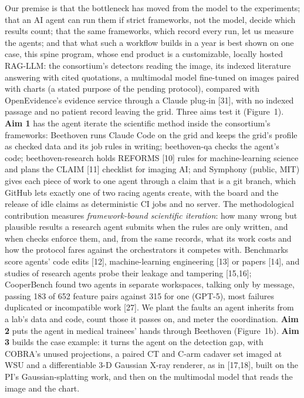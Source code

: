 \documentclass[10pt,letterpaper]{article}
\newcommand{\aim}[1]{{\color{teal}\bfseries #1}}
\begin{document}
Our premise is that the bottleneck has moved from the model to the experiments; that an AI agent can run them if
strict frameworks, not the model, decide which results count; that the same frameworks, which record every run,
let us measure the agents; and that what such a workflow builds in a year is best shown on one case, this spine program,
whose end product is a customizable, locally hosted RAG-LLM: the consortium's detectors reading the image, its indexed
literature answering with cited quotations, a multimodal model fine-tuned on images paired with charts (a stated purpose of the pending protocol), compared with OpenEvidence's evidence service through a Claude plug-in [31], with no
indexed passage and no patient record leaving the grid. Three aims test it (Figure~1). \aim{Aim 1} has the agent iterate the scientific method
inside the consortium's frameworks: Beethoven runs Claude Code on the grid and keeps the grid's profile as checked data
and its job rules in writing; beethoven-qa checks the agent's code; beethoven-research holds REFORMS [10] rules for
machine-learning science and plans the CLAIM [11] checklist for imaging AI; and Symphony (public, MIT) gives each
piece of work to one agent through a claim that is a git branch, which GitHub lets exactly one of two racing agents
create, with the board and the release of idle claims as deterministic CI jobs and no server. The methodological contribution measures \emph{framework-bound scientific iteration}: how many wrong but
plausible results a research agent submits when the rules are only written, and when checks enforce them, and, from
the same records, what its work costs and how the protocol fares against the orchestrators it competes with.
Benchmarks score agents' code edits [12], machine-learning engineering [13] or papers [14], and studies of research
agents probe their leakage and tampering [15,16]; CooperBench found two agents in separate workspaces,
talking only by message, passing 183 of 652 feature pairs against 315 for one (GPT-5), most failures duplicated or
incompatible work [27]. We plant the faults an agent inherits from a lab's data and code, count those it passes on,
and meter the coordination. \aim{Aim 2} puts the agent in medical trainees' hands through Beethoven (Figure~1b).
\aim{Aim 3} builds the case example: it turns the agent on the detection gap, with COBRA's unused projections, a paired
CT and C-arm cadaver set imaged at WSU and a differentiable 3-D Gaussian X-ray renderer, as in [17,18], built on the
PI's Gaussian-splatting work, and then on the multimodal model that reads the image and the chart.
\end{document}
